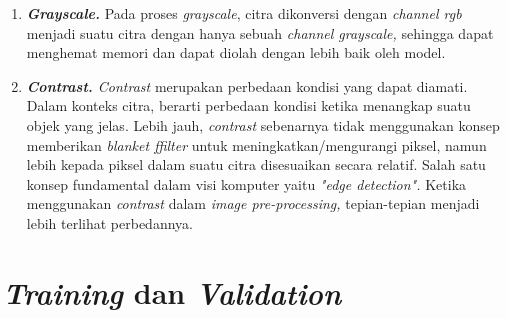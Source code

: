 \begin{enumerate}
    \item \textit{\textbf{Grayscale.}} Pada proses \textit{grayscale}, citra dikonversi dengan \textit{channel rgb} menjadi suatu citra dengan hanya sebuah \textit{channel grayscale,} sehingga dapat menghemat memori dan dapat diolah dengan lebih baik oleh model. 
    \item \textit{\textbf{Contrast.} Contrast} merupakan perbedaan kondisi yang dapat diamati. Dalam konteks citra, berarti perbedaan kondisi ketika menangkap suatu objek yang jelas. Lebih jauh, \textit{contrast} sebenarnya tidak menggunakan konsep memberikan \textit{blanket ffilter} untuk meningkatkan/mengurangi piksel, namun lebih kepada piksel dalam suatu citra disesuaikan secara relatif. Salah satu konsep fundamental dalam visi komputer yaitu \textit{"edge detection".} Ketika menggunakan \textit{contrast} dalam \textit{image pre-processing,} tepian-tepian menjadi lebih terlihat perbedannya.
\end{enumerate}


\section{\textit{Training} dan \textit{Validation}}
\label{sec:trainvaldata}

